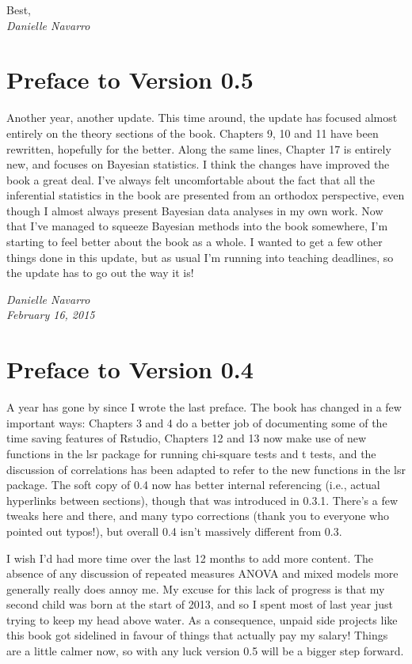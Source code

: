 \documentclass[
  letterpaper,
]{book}
\begin{document}
Best,\\
\emph{Danielle Navarro}

\hypertarget{preface-to-version-0.5}{%
\section*{Preface to Version 0.5}\label{preface-to-version-0.5}}

Another year, another update. This time around, the update has focused
almost entirely on the theory sections of the book. Chapters 9, 10 and
11 have been rewritten, hopefully for the better. Along the same lines,
Chapter 17 is entirely new, and focuses on Bayesian statistics. I think
the changes have improved the book a great deal. I've always felt
uncomfortable about the fact that all the inferential statistics in the
book are presented from an orthodox perspective, even though I almost
always present Bayesian data analyses in my own work. Now that I've
managed to squeeze Bayesian methods into the book somewhere, I'm
starting to feel better about the book as a whole. I wanted to get a few
other things done in this update, but as usual I'm running into teaching
deadlines, so the update has to go out the way it is!

\emph{Danielle Navarro\\
February 16, 2015}

\hypertarget{preface-to-version-0.4}{%
\section*{Preface to Version 0.4}\label{preface-to-version-0.4}}

A year has gone by since I wrote the last preface. The book has changed
in a few important ways: Chapters 3 and 4 do a better job of documenting
some of the time saving features of Rstudio, Chapters 12 and 13 now make
use of new functions in the lsr package for running chi-square tests and
t tests, and the discussion of correlations has been adapted to refer to
the new functions in the lsr package. The soft copy of 0.4 now has
better internal referencing (i.e., actual hyperlinks between sections),
though that was introduced in 0.3.1. There's a few tweaks here and
there, and many typo corrections (thank you to everyone who pointed out
typos!), but overall 0.4 isn't massively different from 0.3.

I wish I'd had more time over the last 12 months to add more content.
The absence of any discussion of repeated measures ANOVA and mixed
models more generally really does annoy me. My excuse for this lack of
progress is that my second child was born at the start of 2013, and so I
spent most of last year just trying to keep my head above water. As a
consequence, unpaid side projects like this book got sidelined in favour
of things that actually pay my salary! Things are a little calmer now,
so with any luck version 0.5 will be a bigger step forward.
\end{document}
